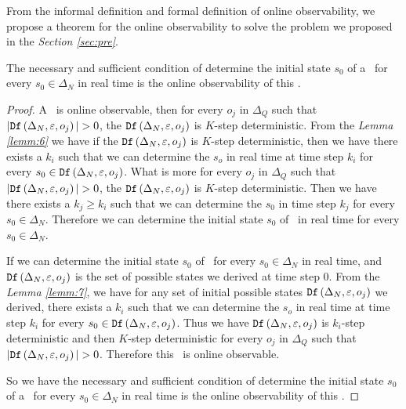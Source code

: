 From the informal definition and formal definition of online observability, we propose a theorem for the online observability to solve the problem we proposed in the {\em Section \ref{sec:pre}}.
\begin{theorem}
The necessary and sufficient condition of determine the initial state $s_0$ of a \BCN\ for every $s_0\in \Delta_N$ in real time is the online observability of this \BCN. 
\label{theo:1}
\end{theorem}
\begin{proof}
 A \BCN\ is online observable,
then for every  $o_j$ in $\Delta_Q$ such that $|\Ded\left(\Delta_N,\varepsilon, o_j\right)|> 0$, the ${\tt Df}\left(\Delta_N,\varepsilon,o_j\right)$ is $K$-step deterministic. From the {\em Lemma \ref{lemm:6}} we have if the ${\tt Df}\left(\Delta_N,\varepsilon,o_j\right)$ is $K$-step deterministic, then we have there exists a $k_i$ such that we can determine the $s_o$ in real time at time step $k_i$ for every $s_0\in {\tt Df}\left(\Delta_N,\varepsilon,o_j\right)$.  What is more for every  $o_j$ in $\Delta_Q$ such that $|\Ded\left(\Delta_N,\varepsilon, o_j\right)|> 0$, the ${\tt Df}\left(\Delta_N,\varepsilon,o_j\right)$ is $K$-step deterministic. Then we have there exists a $k_j\ge k_i$ such that we can determine the $s_0$ in time step $k_j$ for every $s_0\in \Delta_N$. Therefore we can determine the initial state $s_0$ of \BCNs\ in real time for every $s_0\in \Delta_N$.

If we can determine the initial state $s_0$ of \BCNs\ for every $s_0\in \Delta_N$ in real time, and ${\tt Df}\left(\Delta_N,\varepsilon,o_j\right)$ is the set of possible states we derived at time step $0$. From the {\em Lemma \ref{lemm:7}}, we have for any set of initial possible states ${\tt Df}\left(\Delta_N,\varepsilon,o_j\right)$ we derived, there exists a $k_i$ such that we can determine the $s_o$ in real time at time step $k_i$ for every $s_0\in {\tt Df}\left(\Delta_N,\varepsilon,o_j\right)$. Thus we have  ${\tt Df}\left(\Delta_N,\varepsilon,o_j\right)$ is $k_i$-step deterministic and then  $K$-step deterministic for every  $o_j$ in $\Delta_Q$ such that $|\Ded\left(\Delta_N,\varepsilon, o_j\right)|> 0$. Therefore this \BCN\ is online observable.

So we have the necessary and sufficient condition of determine the initial state $s_0$ of a \BCN\ for every $s_0\in \Delta_N$ in real time is the online observability of this \BCN. 
\end{proof}

